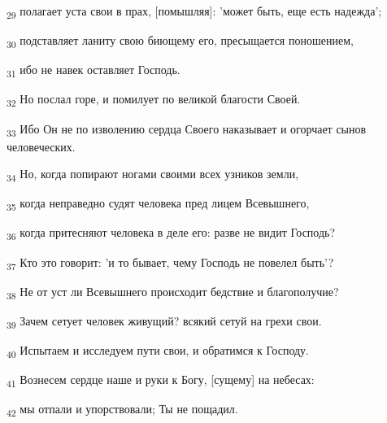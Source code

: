 \begin{tcolorbox}
\textsubscript{29} полагает уста свои в прах, [помышляя]: 'может быть, еще есть надежда';
\end{tcolorbox}
\begin{tcolorbox}
\textsubscript{30} подставляет ланиту свою биющему его, пресыщается поношением,
\end{tcolorbox}
\begin{tcolorbox}
\textsubscript{31} ибо не навек оставляет Господь.
\end{tcolorbox}
\begin{tcolorbox}
\textsubscript{32} Но послал горе, и помилует по великой благости Своей.
\end{tcolorbox}
\begin{tcolorbox}
\textsubscript{33} Ибо Он не по изволению сердца Своего наказывает и огорчает сынов человеческих.
\end{tcolorbox}
\begin{tcolorbox}
\textsubscript{34} Но, когда попирают ногами своими всех узников земли,
\end{tcolorbox}
\begin{tcolorbox}
\textsubscript{35} когда неправедно судят человека пред лицем Всевышнего,
\end{tcolorbox}
\begin{tcolorbox}
\textsubscript{36} когда притесняют человека в деле его: разве не видит Господь?
\end{tcolorbox}
\begin{tcolorbox}
\textsubscript{37} Кто это говорит: 'и то бывает, чему Господь не повелел быть'?
\end{tcolorbox}
\begin{tcolorbox}
\textsubscript{38} Не от уст ли Всевышнего происходит бедствие и благополучие?
\end{tcolorbox}
\begin{tcolorbox}
\textsubscript{39} Зачем сетует человек живущий? всякий сетуй на грехи свои.
\end{tcolorbox}
\begin{tcolorbox}
\textsubscript{40} Испытаем и исследуем пути свои, и обратимся к Господу.
\end{tcolorbox}
\begin{tcolorbox}
\textsubscript{41} Вознесем сердце наше и руки к Богу, [сущему] на небесах:
\end{tcolorbox}
\begin{tcolorbox}
\textsubscript{42} мы отпали и упорствовали; Ты не пощадил.
\end{tcolorbox}
